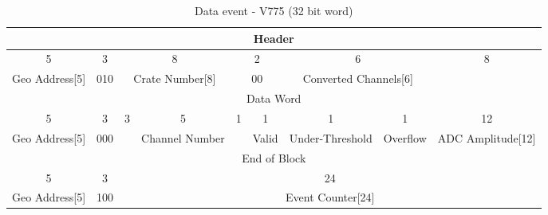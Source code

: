 \begin{landscape}
    \pagebreak
    
    \begin{table}[]
    \ContinuedFloat
    \begin{subtable}[]{1.3\textwidth}
    \centering
    \caption{\label{tab:word_CAEN}Data event - V775 (32 bit word)}
    \begin{tabular}{c|c|c|c|c|c|c|c|c|c|c|c|c|c|c|c|c|c|c|c|c|c|c|c|c|c|c|c|c|c|c|c}
        \toprule
        \multicolumn{32}{c}{Header} \\
        \hline
        \multicolumn{5}{c|}{5} & \multicolumn{3}{|c|}{3} & \multicolumn{8}{|c|}{8} & \multicolumn{2}{|c|}{2} & \multicolumn{6}{|c|}{6} & \multicolumn{8}{|c}{8} \\
        \hline
        \multicolumn{5}{c|}{Geo Address[5]} & \multicolumn{3}{|c|}{010} & \multicolumn{8}{|c|}{Crate Number[8]} & \multicolumn{2}{|c|}{00} & \multicolumn{6}{|c|}{Converted Channels[6]} & \multicolumn{8}{|c}{} \\
        \midrule
        \multicolumn{32}{c}{Data Word} \\
        \hline
        \multicolumn{5}{c|}{5} & \multicolumn{3}{|c|}{3} & \multicolumn{3}{|c|}{3} & \multicolumn{5}{|c|}{5} & 1 & 1 & 1 & 1 & \multicolumn{12}{|c}{12}\\
        \hline
        \multicolumn{5}{c|}{Geo Address[5]} & \multicolumn{3}{|c|}{000} & \multicolumn{3}{|c|}{} & \multicolumn{5}{|c|}{Channel Number} &  & Valid & Under-Threshold & Overflow & \multicolumn{12}{|c}{ADC Amplitude[12]}\\
        \midrule
        \multicolumn{32}{c}{End of Block} \\
        \hline
        \multicolumn{5}{c|}{5} & \multicolumn{3}{|c|}{3} & \multicolumn{24}{|c}{24} \\
        \hline
        \multicolumn{5}{c|}{Geo Address[5]} & \multicolumn{3}{|c|}{100} & \multicolumn{24}{|c}{Event Counter[24]} \\
        \bottomrule
    \end{tabular}
    \end{subtable}
    \end{table}

    \pagebreak
    

\end{landscape}
